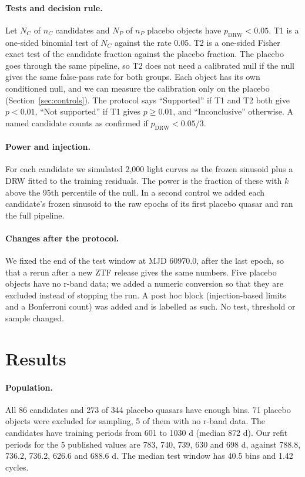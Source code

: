\documentclass[11pt]{article}
\begin{document}
\paragraph{Tests and decision rule.} Let $N_C$ of $n_C$ candidates and $N_P$ of $n_P$ placebo objects have $p_\text{DRW}<0.05$.
T1 is a one-sided binomial test of $N_C$ against the rate 0.05.
T2 is a one-sided Fisher exact test of the candidate fraction against the placebo fraction. The placebo goes through the same pipeline, so T2 does not need a calibrated null if the null gives the same false-pass rate for both groups. Each object has its own conditioned null, and we can measure the calibration only on the placebo (Section~\ref{sec:controls}).
The protocol says ``Supported'' if T1 and T2 both give $p<0.01$, ``Not supported'' if T1 gives $p\ge 0.01$, and ``Inconclusive'' otherwise. A named candidate counts as confirmed if $p_\text{DRW}<0.05/3$.

\paragraph{Power and injection.} For each candidate we simulated 2,000 light curves as the frozen sinusoid plus a DRW fitted to the training residuals. The power is the fraction of these with $k$ above the 95th percentile of the null. In a second control we added each candidate's frozen sinusoid to the raw epochs of its first placebo quasar and ran the full pipeline.

\paragraph{Changes after the protocol.} We fixed the end of the test window at MJD 60970.0, after the last epoch, so that a rerun after a new ZTF release gives the same numbers. Five placebo objects have no r-band data; we added a numeric conversion so that they are excluded instead of stopping the run. A post hoc block (injection-based limits and a Bonferroni count) was added and is labelled as such. No test, threshold or sample changed.

\section{Results}
\paragraph{Population.} All 86 candidates and 273 of 344 placebo quasars have enough bins. 71 placebo objects were excluded for sampling, 5 of them with no r-band data. The candidates have training periods from 601 to 1030 d (median 872 d). Our refit periods for the 5 published values are 783, 740, 739, 630 and 698 d, against 788.8, 736.2, 736.2, 626.6 and 688.6 d. The median test window has 40.5 bins and 1.42 cycles.
\end{document}
